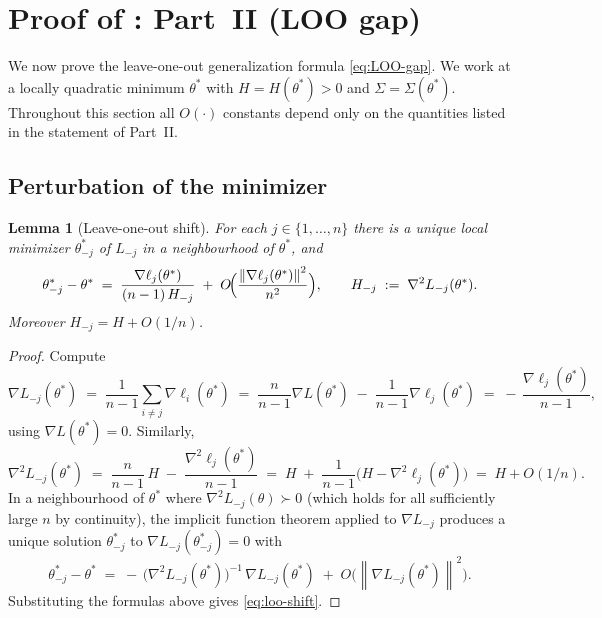 \documentclass[11pt,a4paper]{article}
\newtheorem{lemma}[theorem]{Lemma}
\theoremstyle{definition}
\theoremstyle{remark}
\newcommand{\norm}[1]{\left\|#1\right\|}
\begin{document}
\section{Proof of : Part~II (LOO gap)}
\label{sec:proof-2}

We now prove the leave-one-out generalization formula
\eqref{eq:LOO-gap}.  We work at a locally quadratic minimum $\theta^*$
with $H = H(\theta^*) > 0$ and $\Sigma = \Sigma(\theta^*)$.  Throughout
this section all $O(\cdot)$ constants depend only on the quantities listed
in the statement of Part~II.

\subsection{Perturbation of the minimizer}

\begin{lemma}[Leave-one-out shift]\label{lem:loo-shift}
   For each $j\in\{1,\dots,n\}$ there is a unique local minimizer
   $\theta^*_{-j}$ of $L_{-j}$ in a neighbourhood of $\theta^*$, and
   \begin{equation}\label{eq:loo-shift}
      \theta^*_{-j} - \theta^* \;=\;
      \frac{\nabla\ell_j(\theta^*)}{(n-1)\,H_{-j}}
      \;+\; O\!\Bigl(\frac{\norm{\nabla\ell_j(\theta^*)}^2}{n^2}\Bigr),
      \qquad H_{-j} \;:=\; \nabla^2 L_{-j}(\theta^*).
   \end{equation}
   Moreover $H_{-j} = H + O(1/n)$.
\end{lemma}

\begin{proof}
   Compute
   \[
      \nabla L_{-j}(\theta^*)
      \;=\; \frac{1}{n-1}\sum_{i\neq j} \nabla \ell_i(\theta^*)
      \;=\; \frac{n}{n-1}\nabla L(\theta^*)
            \;-\; \frac{1}{n-1}\nabla \ell_j(\theta^*)
      \;=\; -\,\frac{\nabla\ell_j(\theta^*)}{n-1},
   \]
   using $\nabla L(\theta^*) = 0$.  Similarly,
   \[
      \nabla^2 L_{-j}(\theta^*)
      \;=\; \frac{n}{n-1}\,H \;-\;
            \frac{\nabla^2 \ell_j(\theta^*)}{n-1}
      \;=\; H \;+\; \frac{1}{n-1}\bigl(H - \nabla^2 \ell_j(\theta^*)\bigr)
      \;=\; H + O(1/n).
   \]
   In a neighbourhood of $\theta^*$ where $\nabla^2 L_{-j}(\theta)\succ 0$
   (which holds for all sufficiently large $n$ by continuity), the
   implicit function theorem applied to $\nabla L_{-j}$ produces a unique
   solution $\theta^*_{-j}$ to $\nabla L_{-j}(\theta^*_{-j}) = 0$ with
   \[
      \theta^*_{-j} - \theta^*
      \;=\; -\,\bigl(\nabla^2 L_{-j}(\theta^*)\bigr)^{-1}\,
                  \nabla L_{-j}(\theta^*)
            \;+\; O\bigl(\norm{\nabla L_{-j}(\theta^*)}^2\bigr).
   \]
   Substituting the formulas above gives
   \eqref{eq:loo-shift}.
\end{proof}
\end{document}
